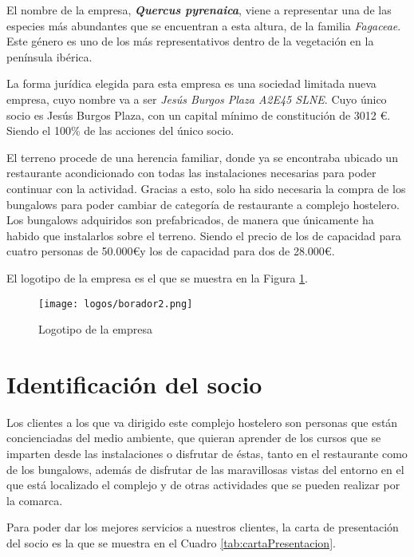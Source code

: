 El nombre de la empresa, \textbf{\textit{Quercus pyrenaica}}, viene a representar  una de las especies más abundantes que se encuentran a esta altura, de la familia \emph{Fagaceae}. Este género es uno de los más representativos dentro de la vegetación en la península ibérica.

La forma jurídica elegida para esta empresa es una sociedad limitada nueva empresa, cuyo nombre va a ser \emph{Jesús Burgos Plaza A2E45 SLNE}. Cuyo único socio es Jesús Burgos Plaza, con un capital mínimo de constitución de 3012 \euro. Siendo el 100\% de las acciones del único socio. 

El terreno procede de una herencia familiar, donde ya se encontraba ubicado un restaurante acondicionado con todas las instalaciones necesarias para poder continuar con la actividad. Gracias a esto, solo ha sido necesaria la compra de los bungalows para poder cambiar de categoría de restaurante a complejo hostelero. Los bungalows adquiridos son prefabricados, de manera que únicamente ha habido que instalarlos sobre el terreno. Siendo el precio de los de capacidad para cuatro personas de 50.000\euro y los de capacidad para dos de 28.000\euro.

El logotipo de la empresa es el que se muestra en la Figura \ref{fig:logo}.

\begin{figure}[htb]
  \begin{center}
    \texttt{[image: logos/borador2.png]}
    \caption{Logotipo de la empresa}
    \label{fig:logo}
  \end{center}
\end{figure}

\section{Identificación del socio}
\label{sec:identificacion}

Los clientes a los que va dirigido este complejo hostelero son personas que están concienciadas del medio ambiente, que quieran aprender de los cursos que se imparten desde las instalaciones o disfrutar de éstas, tanto en el restaurante como de los bungalows, además de disfrutar de las maravillosas vistas del entorno en el que está localizado el complejo y de otras actividades que se pueden realizar por la comarca.

Para poder dar los mejores servicios a nuestros clientes, la carta de presentación del socio es la que se muestra en el Cuadro \ref{tab:cartaPresentacion}.

